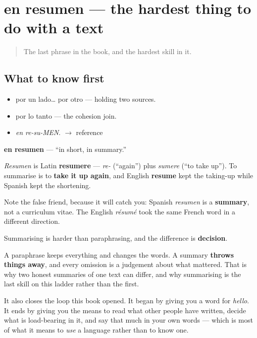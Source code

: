 \section[en resumen]{en resumen — the hardest thing to do with a text}

\label{lesson:ES-C277-en-resumen}



\begin{quote}
The last phrase in the book, and the hardest skill in it.
\end{quote}

\subsection*{What to know first}
\begin{itemize}
\raggedright
  \item por un lado… por otro — holding two sources.
  \item por lo tanto — the cohesion join.
\end{itemize}

\begin{sounds}
\begin{itemize}
\raggedright
  \item \emph{en re-su-MEN}. $\to$ reference
\end{itemize}
\end{sounds}

\begin{cousinweb}
\textbf{en resumen} — \textquotedblleft{}in short, in summary.\textquotedblright{}

\emph{Resumen} is Latin \textbf{resumere} — \emph{re-} (\textquotedblleft{}again\textquotedblright{}) plus \emph{sumere} (\textquotedblleft{}to take up\textquotedblright{}). To summarise is to \textbf{take it up again}, and English \textbf{resume} kept the taking-up while Spanish kept the shortening.

Note the false friend, because it will catch you: Spanish \emph{resumen} is a \textbf{summary}, not a curriculum vitae. The English \emph{résumé} took the same French word in a different direction.
\end{cousinweb}

\begin{grammarlens}[title={What you've built}]
Summarising is harder than paraphrasing, and the difference is \textbf{decision}.

A paraphrase keeps everything and changes the words. A summary \textbf{throws things away}, and every omission is a judgement about what mattered. That is why two honest summaries of one text can differ, and why summarising is the last skill on this ladder rather than the first.

It also closes the loop this book opened. It began by giving you a word for \emph{hello}. It ends by giving you the means to read what other people have written, decide what is load-bearing in it, and say that much in your own words — which is most of what it means to \emph{use} a language rather than to know one.
\end{grammarlens}

